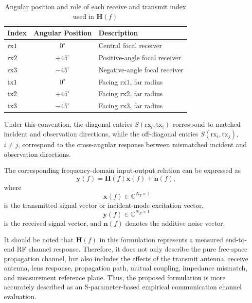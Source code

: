 \begin{table}[h!]
    \centering
    \caption{Angular position and role of each receive and transmit index used in $\mathbf{H}(f)$}
    \label{tab:sparam_index_mapping}
    \begin{tabular}{|l|c|l|}
        \hline
        \textbf{Index} & \textbf{Angular Position} & \textbf{Description} \\
        \hline
        $\mathrm{rx1}$ & $0^\circ$ & Central focal receiver \\
        $\mathrm{rx2}$ & $+45^\circ$ & Positive-angle focal receiver \\
        $\mathrm{rx3}$ & $-45^\circ$ & Negative-angle focal receiver \\
        \hline
        $\mathrm{tx1}$ & $0^\circ$ & Facing $\mathrm{rx1}$, far radius \\
        $\mathrm{tx2}$ & $+45^\circ$ & Facing $\mathrm{rx2}$, far radius \\
        $\mathrm{tx3}$ & $-45^\circ$ & Facing $\mathrm{rx3}$, far radius \\
        \hline
    \end{tabular}
\end{table}

Under this convention, the diagonal entries $S(\mathrm{rx}_i,\mathrm{tx}_i)$ correspond to matched incident and observation directions, while the off-diagonal entries $S(\mathrm{rx}_i,\mathrm{tx}_j)$, $i\neq j$, correspond to the cross-angular response between mismatched incident and observation directions.

The corresponding frequency-domain input-output relation can be expressed as
\begin{equation}
    \mathbf{y}(f) = \mathbf{H}(f)\mathbf{x}(f) + \mathbf{n}(f),
\end{equation}
where
\begin{equation}
    \mathbf{x}(f) \in \mathbb{C}^{N_T \times 1}
\end{equation}
is the transmitted signal vector or incident-mode excitation vector,
\begin{equation}
    \mathbf{y}(f) \in \mathbb{C}^{N_R \times 1}
\end{equation}
is the received signal vector, and \(\mathbf{n}(f)\) denotes the additive noise vector.

It should be noted that \(\mathbf{H}(f)\) in this formulation represents a measured end-to-end RF channel response.
Therefore, it does not only describe the pure free-space propagation channel, but also includes the effects of the transmit antenna, receive antenna, lens response, propagation path, mutual coupling, impedance mismatch, and measurement reference plane.
Thus, the proposed formulation is more accurately described as an S-parameter-based empirical communication channel evaluation.


